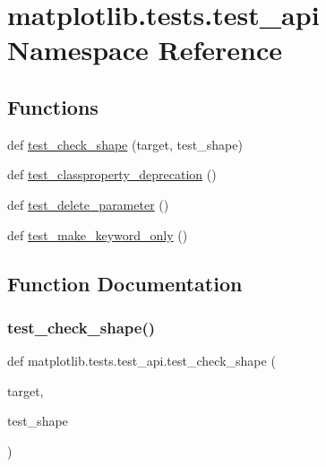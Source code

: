\hypertarget{namespacematplotlib_1_1tests_1_1test__api}{}\section{matplotlib.\+tests.\+test\+\_\+api Namespace Reference}
\label{namespacematplotlib_1_1tests_1_1test__api}
\subsection*{Functions}
\begin{DoxyCompactItemize}
\item 
def \hyperlink{namespacematplotlib_1_1tests_1_1test__api_ac583b7e53d20d167242991c2695cbf2a}{test\+\_\+check\+\_\+shape} (target, test\+\_\+shape)
\item 
def \hyperlink{namespacematplotlib_1_1tests_1_1test__api_a8a89f8271e66987c0fa3c16049b29d97}{test\+\_\+classproperty\+\_\+deprecation} ()
\item 
def \hyperlink{namespacematplotlib_1_1tests_1_1test__api_a82d1ce9eac99ec6b5a0c92eecaa3da34}{test\+\_\+delete\+\_\+parameter} ()
\item 
def \hyperlink{namespacematplotlib_1_1tests_1_1test__api_ab711cf4c723511a0b149cd54f9357b68}{test\+\_\+make\+\_\+keyword\+\_\+only} ()
\end{DoxyCompactItemize}


\subsection{Function Documentation}
\mbox{\label{namespacematplotlib_1_1tests_1_1test__api_ac583b7e53d20d167242991c2695cbf2a}} 
\subsubsection{\texorpdfstring{test\+\_\+check\+\_\+shape()}{test\_check\_shape()}}
{\footnotesize\ttfamily def matplotlib.\+tests.\+test\+\_\+api.\+test\+\_\+check\+\_\+shape (\begin{DoxyParamCaption}\item[{}]{target,  }\item[{}]{test\+\_\+shape }\end{DoxyParamCaption})}


